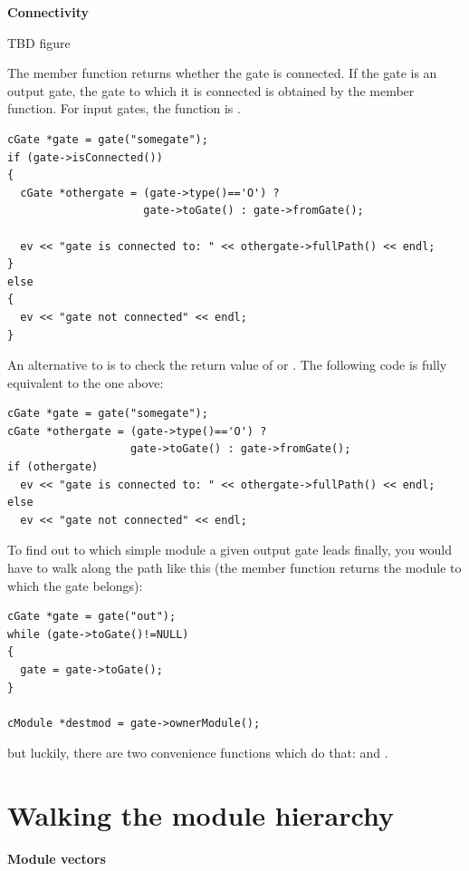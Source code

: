 \textbf{Connectivity}


TBD figure

The  member function returns whether
the gate is connected. If the gate is an output gate, the gate to
which it is connected is obtained by the 
member function. For input gates, the function is
.

\begin{Verbatim}
cGate *gate = gate("somegate");
if (gate->isConnected())
{
  cGate *othergate = (gate->type()=='O') ?
                     gate->toGate() : gate->fromGate();

  ev << "gate is connected to: " << othergate->fullPath() << endl;
}
else
{
  ev << "gate not connected" << endl;
}
\end{Verbatim}


An alternative to  is to check the return value 
of  or . The following code is fully equivalent 
to the one above:

\begin{Verbatim}
cGate *gate = gate("somegate");
cGate *othergate = (gate->type()=='O') ?
                   gate->toGate() : gate->fromGate();
if (othergate)
  ev << "gate is connected to: " << othergate->fullPath() << endl;
else
  ev << "gate not connected" << endl;
\end{Verbatim}

To find out to which simple module a given output
gate leads finally, you would have to walk
along the path like this (the  member function
returns the module to which the gate belongs):

\begin{Verbatim}
cGate *gate = gate("out");
while (gate->toGate()!=NULL) 
{
  gate = gate->toGate();
}

cModule *destmod = gate->ownerModule();
\end{Verbatim}


but luckily, there are two convenience functions which do that:
 and
.





\section{Walking the module hierarchy}

\textbf{Module vectors}


